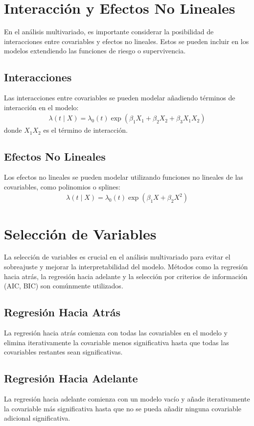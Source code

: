 \documentclass[a4paper]{report} %
\begin{document}
\section*{Interacci\'on y Efectos No Lineales}
En el an\'alisis multivariado, es importante considerar la posibilidad de interacciones entre covariables y efectos no lineales. Estos se pueden incluir en los modelos extendiendo las funciones de riesgo o supervivencia.

\subsection*{Interacciones}
Las interacciones entre covariables se pueden modelar a\~nadiendo t\'erminos de interacci\'on en el modelo:
\begin{eqnarray*}
\lambda(t \mid X) = \lambda_0(t) \exp(\beta_1 X_1 + \beta_2 X_2 + \beta_3 X_1 X_2)
\end{eqnarray*}
donde $X_1 X_2$ es el t\'ermino de interacci\'on.

\subsection*{Efectos No Lineales}
Los efectos no lineales se pueden modelar utilizando funciones no lineales de las covariables, como polinomios o splines:
\begin{eqnarray*}
\lambda(t \mid X) = \lambda_0(t) \exp(\beta_1 X + \beta_2 X^2)
\end{eqnarray*}

\section*{Selecci\'on de Variables}
La selecci\'on de variables es crucial en el an\'alisis multivariado para evitar el sobreajuste y mejorar la interpretabilidad del modelo. M\'etodos como la regresi\'on hacia atr\'as, la regresi\'on hacia adelante y la selecci\'on por criterios de informaci\'on (AIC, BIC) son com\'unmente utilizados.

\subsection*{Regresi\'on Hacia Atr\'as}
La regresi\'on hacia atr\'as comienza con todas las covariables en el modelo y elimina iterativamente la covariable menos significativa hasta que todas las covariables restantes sean significativas.

\subsection*{Regresi\'on Hacia Adelante}
La regresi\'on hacia adelante comienza con un modelo vac\'io y a\~nade iterativamente la covariable m\'as significativa hasta que no se pueda a\~nadir ninguna covariable adicional significativa.
\end{document}
